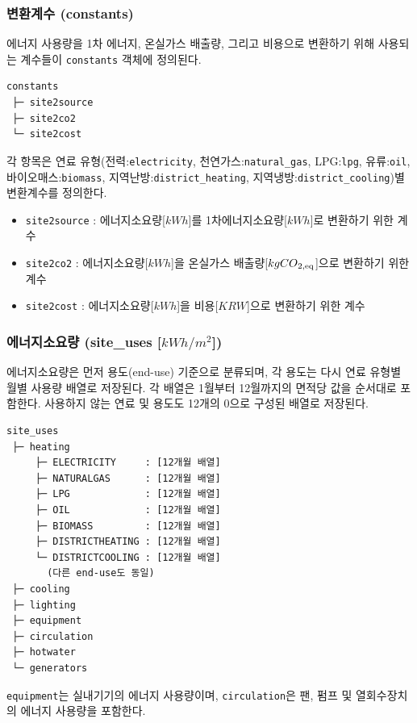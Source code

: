 \subsubsection{변환계수 (constants)}

에너지 사용량을 1차 에너지, 온실가스 배출량, 그리고 비용으로 변환하기 위해 사용되는 계수들이 \texttt{constants} 객체에 정의된다.

\begin{verbatim}
constants
 ├─ site2source
 ├─ site2co2
 └─ site2cost
\end{verbatim}

각 항목은 연료 유형(전력:\texttt{electricity}, 천연가스:\texttt{natural\_\allowbreak gas}, LPG:\texttt{lpg}, 유류:\texttt{oil}, 바이오매스:\texttt{biomass}, 지역난방:\texttt{district\_\allowbreak heating}, 지역냉방:\texttt{district\_\allowbreak cooling})별 변환계수를 정의한다.

\begin{itemize}
\item \texttt{site2source} : 에너지소요량[$kWh$]를 1차에너지소요량[$kWh$]로 변환하기 위한 계수
\item \texttt{site2co2} : 에너지소요량[$kWh$]을 온실가스 배출량[$kgCO\textsubscript{2,eq}$]으로 변환하기 위한 계수
\item \texttt{site2cost} : 에너지소요량[$kWh$]을 비용[$KRW$]으로 변환하기 위한 계수
\end{itemize}

\subsubsection{에너지소요량 (site\_uses [$kWh/m^2$])}

에너지소요량은 먼저 용도(end-use) 기준으로 분류되며, 각 용도는 다시 연료 유형별 월별 사용량 배열로 저장된다. 각 배열은 1월부터 12월까지의 면적당 값을 순서대로 포함한다. 사용하지 않는 연료 및 용도도 12개의 0으로 구성된 배열로 저장된다.

\begin{verbatim}
site_uses
 ├─ heating
     ├─ ELECTRICITY     : [12개월 배열]
     ├─ NATURALGAS      : [12개월 배열]
     ├─ LPG             : [12개월 배열]
     ├─ OIL             : [12개월 배열]
     ├─ BIOMASS         : [12개월 배열]
     ├─ DISTRICTHEATING : [12개월 배열]
     └─ DISTRICTCOOLING : [12개월 배열]
       (다른 end-use도 동일)
 ├─ cooling
 ├─ lighting
 ├─ equipment
 ├─ circulation
 ├─ hotwater
 └─ generators
\end{verbatim}

\texttt{equipment}는 실내기기의 에너지 사용량이며, \texttt{circulation}은 팬, 펌프 및 열회수장치의 에너지 사용량을 포함한다.

